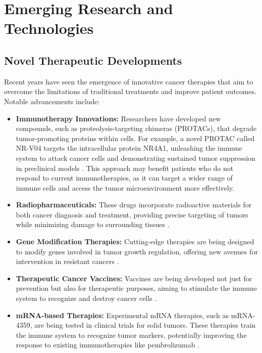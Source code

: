 \section{Emerging Research and Technologies}

\subsection{Novel Therapeutic Developments}

Recent years have seen the emergence of innovative cancer therapies that aim to overcome the 
limitations of traditional treatments and improve patient outcomes. Notable advancements include:

\begin{itemize}
    \item \textbf{Immunotherapy Innovations:} Researchers have developed new compounds, such as 
    proteolysis-targeting chimeras (PROTACs), that degrade tumor-promoting proteins within cells. 
    For example, a novel PROTAC called NR-V04 targets the intracellular protein NR4A1, unleashing 
    the immune system to attack cancer cells and demonstrating sustained tumor suppression in 
    preclinical models \cite{aiOncology2025}. This approach may benefit patients who do not respond 
    to current immunotherapies, as it can target a wider range of immune cells and access the tumor 
    microenvironment more effectively.

    \item \textbf{Radiopharmaceuticals:} These drugs incorporate radioactive materials for both 
    cancer diagnosis and treatment, providing precise targeting of tumors while minimizing damage to 
    surrounding tissues \cite{mrnaTherapy2025}.

    \item \textbf{Gene Modification Therapies:} Cutting-edge therapies are being designed to modify 
    genes involved in tumor growth regulation, offering new avenues for intervention in resistant 
    cancers \cite{mrnaTherapy2025}.

    \item \textbf{Therapeutic Cancer Vaccines:} Vaccines are being developed not just for prevention 
    but also for therapeutic purposes, aiming to stimulate the immune system to recognize and 
    destroy cancer cells \cite{mrnaTherapy2025}.

    \item \textbf{mRNA-based Therapies:} Experimental mRNA therapies, such as mRNA-4359, are being 
    tested in clinical trials for solid tumors. These therapies train the immune system to recognize 
    tumor markers, potentially improving the response to existing immunotherapies like 
    pembrolizumab \cite{nlmCitingMedicine2007}.
\end{itemize}

